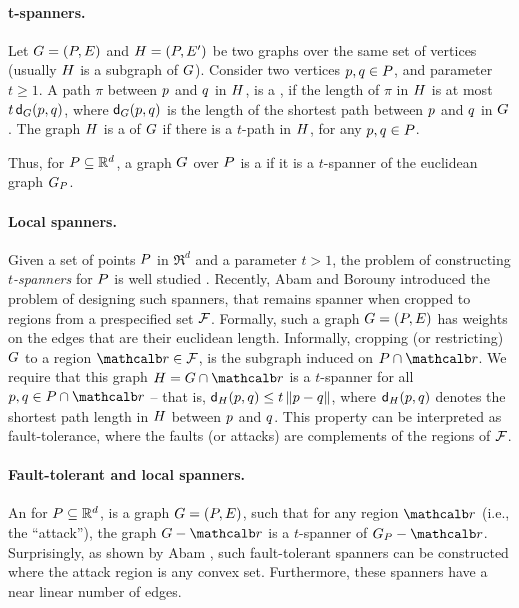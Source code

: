 \documentclass[12pt]{article}%
\begin{document}
\paragraph{t-spanners.}
Let $G=(P,E)$ and $H=(P,E')$ be two graphs over the same
set of vertices (usually $H$ is a subgraph of $G$). Consider two
vertices $p,q \in P$, and parameter $t \geq 1$.  A path $\pi$
between $p$ and $q$ in $H$, is a , if the length
of $\pi$ in $H$ is at most $t\,\dGZ{\G}{\pa}{\pb}$, where
$\dGZ{\G}{\pa}{\pb}$ is the length of the shortest path between $p$
and $q$ in $G$.  The graph $H$ is a  of $G$
if there is a $t$-path in $H$, for any $p,q\in P$.

Thus, for $P\subseteq \mathbb{R}^d$, a graph $G$ over $P$ is a
 if it is a $t$-spanner of the euclidean graph
$G_P$.


\paragraph{Local spanners.}
Given a set of points $P$ in $\Re^d$ and a parameter $t>1$, the
problem of constructing \emph{$t$-spanners} for $P$ is well studied
\cite{ns-gsn-07}.  Recently, Abam and Borouny \cite{ab-lgs-21}
introduced the problem of designing such spanners, that remains
spanner when cropped to regions from a prespecified set
$\mathcal{F}$. Formally, such a graph $G = (P,E)$ has weights on the
edges that are their euclidean length. Informally, cropping (or
restricting) $G$ to a region $\region \in \FF$, is the subgraph
induced on $\PS \cap \region$. We require that this graph
$\GB = \restrictY{\G}{\region}$ is a $t$-spanner for all
$\pa,\pb \in \PS \cap \region$ -- that is,
$\dGZ{\GB}{\pa}{\pb} \leq t \dY{\pa}{\pb}$, where
$\dGZ{\GB}{\pa}{\pb}$ denotes the shortest path length in $H$
between $p$ and $q$.  This property can be interpreted as
fault-tolerance, where the faults (or attacks) are complements of the
regions of $\mathcal{F}$.






\paragraph{Fault-tolerant and local spanners.}

An  for $P\subseteq \mathbb{R}^d$, is
a graph $G=(P, E)$, such that for any region $\region$ (i.e., the
``attack''), the graph $\G \gminus \region$ is a $t$-spanner of
$\G_\PS - \region$. Surprisingly, as shown by Abam \etal
\cite{abfg-rftgs-09}, such fault-tolerant spanners can be constructed
where the attack region is any convex set. Furthermore, these spanners
have a near linear number of edges.
\end{document}
